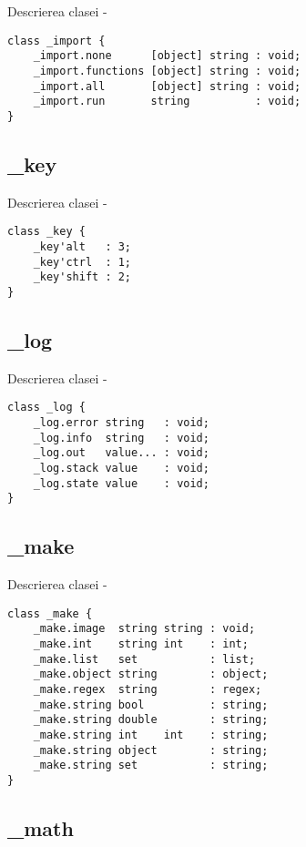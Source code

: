 \noindent Descrierea clasei  -
\begin{lstlisting}[numbers=none]
class _import {
	_import.none      [object] string : void;
	_import.functions [object] string : void;
	_import.all       [object] string : void;
	_import.run       string          : void;
}
\end{lstlisting}

\subsection{{\color{orange} \_key}}

\noindent Descrierea clasei  -
\begin{lstlisting}[numbers=none]
class _key {
	_key'alt   : 3;
	_key'ctrl  : 1;
	_key'shift : 2;
}
\end{lstlisting}

\subsection{{\color{orange} \_log}}

\noindent Descrierea clasei  -
\begin{lstlisting}[numbers=none]
class _log {
	_log.error string   : void;
	_log.info  string   : void;
	_log.out   value... : void;
	_log.stack value    : void;
	_log.state value    : void;
}
\end{lstlisting}

\subsection{{\color{orange} \_make}}

\noindent Descrierea clasei  -
\begin{lstlisting}[numbers=none]
class _make {
	_make.image  string string : void;
	_make.int    string int    : int;
	_make.list   set           : list;
	_make.object string        : object;
	_make.regex  string        : regex;
	_make.string bool          : string;
	_make.string double        : string;
	_make.string int    int    : string;
	_make.string object        : string;
	_make.string set           : string;
}
\end{lstlisting}

\subsection{{\color{orange} \_math}}

